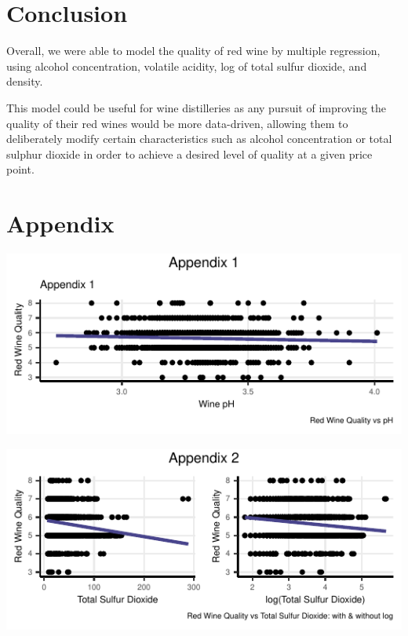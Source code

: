 \documentclass[letterpaper,8pt,twocolumn,twoside,]{pinp}
\begin{document}
\hypertarget{conclusion}{%
\section{Conclusion}\label{conclusion}}

Overall, we were able to model the quality of red wine by multiple
regression, using alcohol concentration, volatile acidity, log of total
sulfur dioxide, and density.

This model could be useful for wine distilleries as any pursuit of
improving the quality of their red wines would be more data-driven,
allowing them to deliberately modify certain characteristics such as
alcohol concentration or total sulphur dioxide in order to achieve a
desired level of quality at a given price point.

\pagebreak

\hypertarget{appendix}{%
\section{Appendix}\label{appendix}}

\begin{center}\includegraphics{pinp_files/figure-latex/unnamed-chunk-4-1} \end{center}

\begin{center}\includegraphics{pinp_files/figure-latex/unnamed-chunk-4-2} \end{center}
\end{document}
